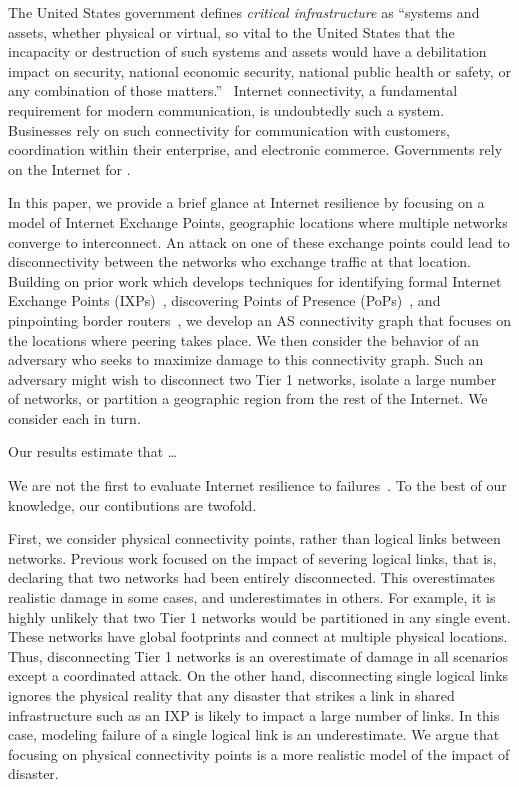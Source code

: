     The United States government defines {\it critical infrastructure} as ``systems and assets, whether physical or virtual, so vital to the United States that the incapacity or destruction of such systems and assets would have a debilitation impact on security, national economic security, national public health or safety, or any combination of those matters.''~\cite{patriotact}
    Internet connectivity, a fundamental requirement for modern communication, is undoubtedly such a system.
    Businesses rely on such connectivity for communication with customers, coordination within their enterprise, and electronic commerce.
    Governments rely on the Internet for .

    In this paper, we provide a brief glance at Internet resilience by focusing on a model of Internet Exchange Points, geographic locations where multiple networks converge to interconnect.
    An attack on one of these exchange points could lead to disconnectivity between the networks who exchange traffic at that location.
    Building on prior work which develops techniques for identifying formal Internet Exchange Points (IXPs)~\cite{ixps-mapped}, discovering Points of Presence (PoPs)~\cite{iplane}, and pinpointing border routers~\cite{asbrsomething}, we develop an AS connectivity graph that focuses on the locations where peering takes place.
    We then consider the behavior of an adversary who seeks to maximize damage to this connectivity graph.
    Such an adversary might wish to disconnect two Tier 1 networks, isolate a large number of networks, or partition a geographic region from the rest of the Internet.
    We consider each in turn.

    Our results estimate that \ldots

    We are not the first to evaluate Internet resilience to failures~\cite{michigan, probablymore}. 
    To the best of our knowledge, our contibutions are twofold.

            First, we consider physical connectivity points, rather than logical links between networks.
            Previous work focused on the impact of severing logical links, that is, declaring that two networks had been entirely disconnected. 
            This overestimates realistic damage in some cases, and underestimates in others.
            For example, it is highly unlikely that two Tier 1 networks would be partitioned in any single event.
            These networks have global footprints and connect at multiple physical locations.
            Thus, disconnecting Tier 1 networks is an overestimate of damage in all scenarios except a coordinated attack.
            On the other hand, disconnecting single logical links ignores the physical reality that any disaster that strikes a link in shared infrastructure such as an IXP is likely to impact a large number of links.
            In this case, modeling failure of a single logical link is an underestimate.
            We argue that focusing on physical connectivity points is a more realistic model of the impact of disaster. 
 
